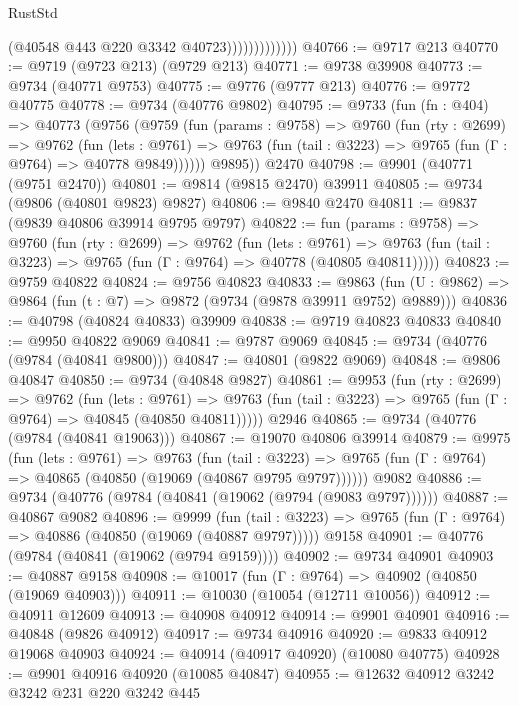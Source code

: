 \begin{lexlean}{RustStd}
\begin{coremodule}
                            (@40548 @443 @220 @3342 @40723)))))))))))))
@40766 := @9717 @213
@40770 := @9719 (@9723 @213) (@9729 @213)
@40771 := @9738 @39908
@40773 := @9734 (@40771 @9753)
@40775 := @9776 (@9777 @213)
@40776 := @9772 @40775
@40778 := @9734 (@40776 @9802)
@40795 := @9733
    (fun (fn : @404) =>
    @40773
      (@9756
        (@9759
          (fun (params : @9758) =>
          @9760
            (fun (rty : @2699) =>
            @9762
              (fun (lets : @9761) =>
              @9763 (fun (tail : @3223) => @9765 (fun (Γ : @9764) => @40778 @9849))))))
        @9895))
    @2470
@40798 := @9901 (@40771 (@9751 @2470))
@40801 := @9814 (@9815 @2470) @39911
@40805 := @9734 (@9806 (@40801 @9823) @9827)
@40806 := @9840 @2470
@40811 := @9837 (@9839 @40806 @39914 @9795 @9797)
@40822 := fun (params : @9758) =>
  @9760
    (fun (rty : @2699) =>
    @9762
      (fun (lets : @9761) =>
      @9763 (fun (tail : @3223) => @9765 (fun (Γ : @9764) => @40778 (@40805 @40811)))))
@40823 := @9759 @40822
@40824 := @9756 @40823
@40833 := @9863
    (fun (U : @9862) => @9864 (fun (t : @7) => @9872 (@9734 (@9878 @39911 @9752) @9889)))
@40836 := @40798 (@40824 @40833) @39909
@40838 := @9719 @40823 @40833
@40840 := @9950 @40822 @9069
@40841 := @9787 @9069
@40845 := @9734 (@40776 (@9784 (@40841 @9800)))
@40847 := @40801 (@9822 @9069)
@40848 := @9806 @40847
@40850 := @9734 (@40848 @9827)
@40861 := @9953
    (fun (rty : @2699) =>
    @9762
      (fun (lets : @9761) =>
      @9763 (fun (tail : @3223) => @9765 (fun (Γ : @9764) => @40845 (@40850 @40811)))))
    @2946
@40865 := @9734 (@40776 (@9784 (@40841 @19063)))
@40867 := @19070 @40806 @39914
@40879 := @9975
    (fun (lets : @9761) =>
    @9763
      (fun (tail : @3223) =>
      @9765 (fun (Γ : @9764) => @40865 (@40850 (@19069 (@40867 @9795 @9797))))))
    @9082
@40886 := @9734 (@40776 (@9784 (@40841 (@19062 (@9794 (@9083 @9797))))))
@40887 := @40867 @9082
@40896 := @9999
    (fun (tail : @3223) => @9765 (fun (Γ : @9764) => @40886 (@40850 (@19069 (@40887 @9797)))))
    @9158
@40901 := @40776 (@9784 (@40841 (@19062 (@9794 @9159))))
@40902 := @9734 @40901
@40903 := @40887 @9158
@40908 := @10017 (fun (Γ : @9764) => @40902 (@40850 (@19069 @40903)))
@40911 := @10030 (@10054 (@12711 @10056))
@40912 := @40911 @12609
@40913 := @40908 @40912
@40914 := @9901 @40901
@40916 := @40848 (@9826 @40912)
@40917 := @9734 @40916
@40920 := @9833 @40912 @19068 @40903
@40924 := @40914 (@40917 @40920) (@10080 @40775)
@40928 := @9901 @40916 @40920 (@10085 @40847)
@40955 := @12632
    @40912
    @3242
    @3242
    @231
    @220
    @3242
    @445

\end{coremodule}
\end{lexlean}
